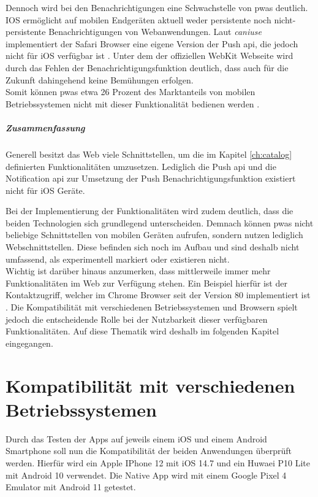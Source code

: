 Dennoch wird bei den Benachrichtigungen eine Schwachstelle von \acp{pwa} deutlich.
IOS ermöglicht auf mobilen Endgeräten aktuell weder persistente noch nicht-persistente Benachrichtigungen von Webanwendungen.
Laut \textit{caniuse} implementiert der Safari Browser eine eigene Version der Push \ac{api}, die jedoch nicht für iOS verfügbar ist \cite{caniuse.com.2021}.
Unter dem  der offiziellen WebKit Webseite wird durch das Fehlen der Benachrichtigungsfunktion deutlich, dass auch für die Zukunft dahingehend keine Bemühungen erfolgen.\\
Somit können \acp{pwa} etwa 26 Prozent des Marktanteils von mobilen Betriebssystemen nicht mit dieser Funktionalität bedienen werden \cite{o.V..2021b}.

\subparagraph{Zusammenfassung\\}
Generell besitzt das Web viele Schnittstellen, um die im Kapitel \ref{ch:catalog} definierten Funktionalitäten umzusetzen.
Lediglich die Push \ac{api} und die Notification \ac{api} zur Umsetzung der Push Benachrichtigungsfunktion existiert nicht für iOS Geräte.

Bei der Implementierung der Funktionalitäten wird zudem deutlich, dass die beiden Technologien sich grundlegend unterscheiden.
Demnach können \acp{pwa} nicht beliebige Schnittstellen von mobilen Geräten aufrufen, sondern nutzen lediglich Webschnittstellen.
Diese befinden sich noch im Aufbau und sind deshalb nicht umfassend, als experimentell markiert oder existieren nicht.\\
Wichtig ist darüber hinaus anzumerken, dass mittlerweile immer mehr Funktionalitäten im Web zur Verfügung stehen.
Ein Beispiel hierfür ist der Kontaktzugriff, welcher im Chrome Browser seit der Version 80 implementiert ist \cite{MDNcontributors.22.06.2021}.
Die Kompatibilität mit verschiedenen Betriebssystemen und Browsern spielt jedoch die entscheidende Rolle bei der Nutzbarkeit dieser verfügbaren Funktionalitäten.
Auf diese Thematik wird deshalb im folgenden Kapitel eingegangen.

\section{Kompatibilität mit verschiedenen Betriebssystemen} 
Durch das Testen der Apps auf jeweils einem iOS und einem Android Smartphone soll nun die Kompatibilität der beiden Anwendungen überprüft werden.
Hierfür wird ein Apple IPhone 12 mit iOS 14.7 und ein Huwaei P10 Lite mit Android 10 verwendet.
Die Native App wird mit einem Google Pixel 4 Emulator mit Android 11 getestet.

